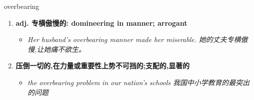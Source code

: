 
\begin{frame}
{\huge overbearing}
\begin{center}
\begin{enumerate}\Large
  \item \textbf{adj. 专横傲慢的: domineering in manner; arrogant}
  \begin{itemize}
    \item \em{\Large{Her husband's overbearing manner made her miserable. 她的丈夫专横傲慢,让她痛不欲生。}}
  \end{itemize}
  \item \textbf{压倒一切的,在力量或重要性上势不可挡的;支配的,显著的}
  \begin{itemize}
    \item \em{\Large{the overbearing problem in our nation's schools 我国中小学教育的最突出的问题}}
  \end{itemize}
\end{enumerate}
\end{center}
\end{frame}
